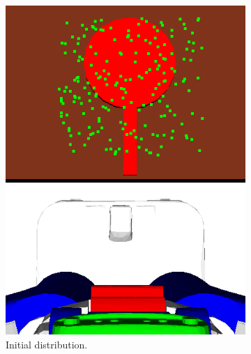 \begin{figure}[h!]
\begin{subfigure}[b]{0.25\linewidth}
    \includegraphics[width=\textwidth]{images/frying_initial.png}
    \caption{Initial distribution.}
  \end{subfigure}
  \begin{subfigure}[b]{0.25\linewidth}

\end{subfigure}
\end{figure}
